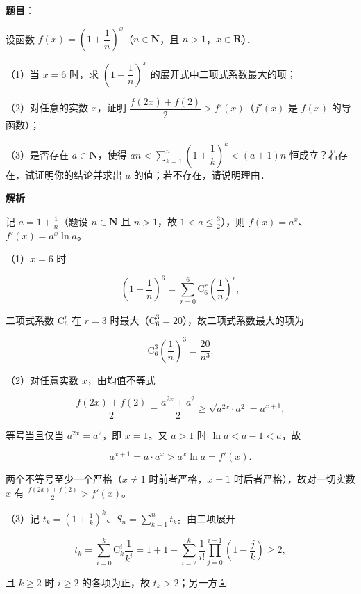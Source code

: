 \begin{answer}

\textbf{题目}：

设函数 $f(x)=\left(1+\dfrac1n\right)^x$（$n\in\mathbf N$，且 $n>1$，$x\in\mathbf R$）．

（1）当 $x=6$ 时，求 $\left(1+\dfrac1n\right)^x$ 的展开式中二项式系数最大的项；

（2）对任意的实数 $x$，证明 $\dfrac{f(2x)+f(2)}{2}>f'(x)$（$f'(x)$ 是 $f(x)$ 的导函数）；

（3）是否存在 $a\in\mathbf N$，使得 $an<\sum\limits_{k=1}^{n}\left(1+\dfrac1k\right)^k<(a+1)n$ 恒成立？若存在，试证明你的结论并求出 $a$ 的值；若不存在，请说明理由．

\textbf{解析}

记 $a=1+\frac1n$（题设 $n\in\mathbf N$ 且 $n>1$，故 $1<a\leqslant\frac32$），则 $f(x)=a^{x}$、$f'(x)=a^{x}\ln a$。

（1）$x=6$ 时

\nopagebreak[4]
\[\left(1+\frac1n\right)^{6}=\sum_{r=0}^{6}\mathrm{C}_6^{r}\left(\frac1n\right)^{r},\]

二项式系数 $\mathrm{C}_6^{r}$ 在 $r=3$ 时最大（$\mathrm{C}_6^{3}=20$），故二项式系数最大的项为

\nopagebreak[4]
\[\mathrm{C}_6^{3}\left(\frac1n\right)^{3}=\frac{20}{n^{3}}.\]

（2）对任意实数 $x$，由均值不等式

\nopagebreak[4]
\[\frac{f(2x)+f(2)}{2}=\frac{a^{2x}+a^{2}}{2}\geqslant\sqrt{a^{2x}\cdot a^{2}}=a^{x+1},\]

等号当且仅当 $a^{2x}=a^{2}$，即 $x=1$。又 $a>1$ 时 $\ln a<a-1<a$，故

\nopagebreak[4]
\[a^{x+1}=a\cdot a^{x}>a^{x}\ln a=f'(x).\]

两个不等号至少一个严格（$x\ne1$ 时前者严格，$x=1$ 时后者严格），故对一切实数 $x$ 有 $\frac{f(2x)+f(2)}{2}>f'(x)$。

（3）记 $t_k=\left(1+\frac1k\right)^{k}$、$S_n=\sum\limits_{k=1}^{n}t_k$。由二项展开

\nopagebreak[4]
\[t_k=\sum_{i=0}^{k}\mathrm{C}_k^{i}\frac{1}{k^{i}}=1+1+\sum_{i=2}^{k}\frac{1}{i!}\prod_{j=0}^{i-1}\left(1-\frac jk\right)\geqslant2,\]

且 $k\geqslant2$ 时 $i\geqslant2$ 的各项为正，故 $t_k>2$；另一方面


\end{answer}
